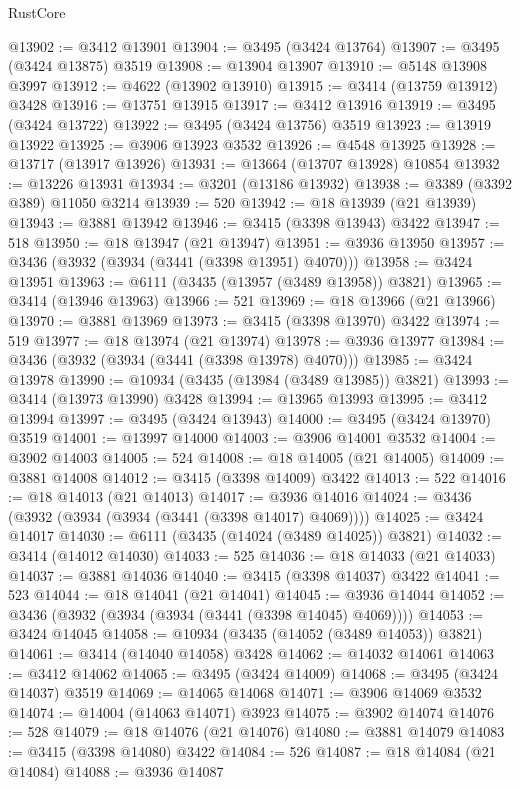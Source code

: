 \begin{lexlean}{RustCore}
\begin{coremodule}
@13902 := @3412 @13901
@13904 := @3495 (@3424 @13764)
@13907 := @3495 (@3424 @13875) @3519
@13908 := @13904 @13907
@13910 := @5148 @13908 @3997
@13912 := @4622 (@13902 @13910)
@13915 := @3414 (@13759 @13912) @3428
@13916 := @13751 @13915
@13917 := @3412 @13916
@13919 := @3495 (@3424 @13722)
@13922 := @3495 (@3424 @13756) @3519
@13923 := @13919 @13922
@13925 := @3906 @13923 @3532
@13926 := @4548 @13925
@13928 := @13717 (@13917 @13926)
@13931 := @13664 (@13707 @13928) @10854
@13932 := @13226 @13931
@13934 := @3201 (@13186 @13932)
@13938 := @3389 (@3392 @389) @11050 @3214
@13939 := 520
@13942 := @18 @13939 (@21 @13939)
@13943 := @3881 @13942
@13946 := @3415 (@3398 @13943) @3422
@13947 := 518
@13950 := @18 @13947 (@21 @13947)
@13951 := @3936 @13950
@13957 := @3436 (@3932 (@3934 (@3441 (@3398 @13951) @4070)))
@13958 := @3424 @13951
@13963 := @6111 (@3435 (@13957 (@3489 @13958)) @3821)
@13965 := @3414 (@13946 @13963)
@13966 := 521
@13969 := @18 @13966 (@21 @13966)
@13970 := @3881 @13969
@13973 := @3415 (@3398 @13970) @3422
@13974 := 519
@13977 := @18 @13974 (@21 @13974)
@13978 := @3936 @13977
@13984 := @3436 (@3932 (@3934 (@3441 (@3398 @13978) @4070)))
@13985 := @3424 @13978
@13990 := @10934 (@3435 (@13984 (@3489 @13985)) @3821)
@13993 := @3414 (@13973 @13990) @3428
@13994 := @13965 @13993
@13995 := @3412 @13994
@13997 := @3495 (@3424 @13943)
@14000 := @3495 (@3424 @13970) @3519
@14001 := @13997 @14000
@14003 := @3906 @14001 @3532
@14004 := @3902 @14003
@14005 := 524
@14008 := @18 @14005 (@21 @14005)
@14009 := @3881 @14008
@14012 := @3415 (@3398 @14009) @3422
@14013 := 522
@14016 := @18 @14013 (@21 @14013)
@14017 := @3936 @14016
@14024 := @3436 (@3932 (@3934 (@3934 (@3441 (@3398 @14017) @4069))))
@14025 := @3424 @14017
@14030 := @6111 (@3435 (@14024 (@3489 @14025)) @3821)
@14032 := @3414 (@14012 @14030)
@14033 := 525
@14036 := @18 @14033 (@21 @14033)
@14037 := @3881 @14036
@14040 := @3415 (@3398 @14037) @3422
@14041 := 523
@14044 := @18 @14041 (@21 @14041)
@14045 := @3936 @14044
@14052 := @3436 (@3932 (@3934 (@3934 (@3441 (@3398 @14045) @4069))))
@14053 := @3424 @14045
@14058 := @10934 (@3435 (@14052 (@3489 @14053)) @3821)
@14061 := @3414 (@14040 @14058) @3428
@14062 := @14032 @14061
@14063 := @3412 @14062
@14065 := @3495 (@3424 @14009)
@14068 := @3495 (@3424 @14037) @3519
@14069 := @14065 @14068
@14071 := @3906 @14069 @3532
@14074 := @14004 (@14063 @14071) @3923
@14075 := @3902 @14074
@14076 := 528
@14079 := @18 @14076 (@21 @14076)
@14080 := @3881 @14079
@14083 := @3415 (@3398 @14080) @3422
@14084 := 526
@14087 := @18 @14084 (@21 @14084)
@14088 := @3936 @14087

\end{coremodule}
\end{lexlean}
